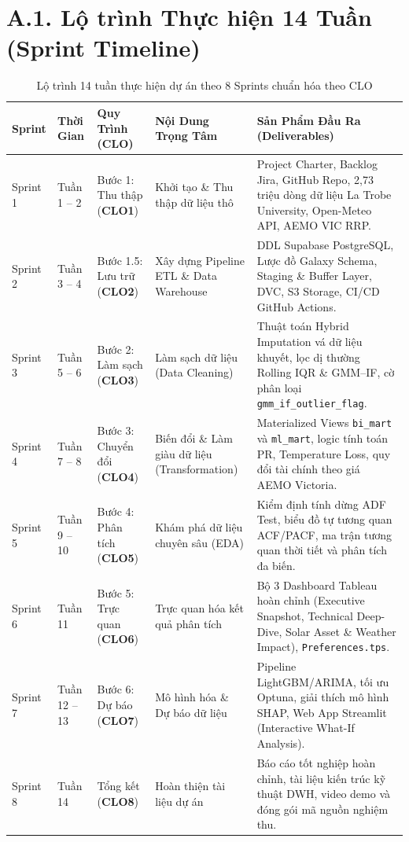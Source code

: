 \documentclass[12pt, a4paper]{report}
\begin{document}
\section*{A.1. Lộ trình Thực hiện 14 Tuần (Sprint Timeline)}
\begin{table}[H]
\centering
\caption{Lộ trình 14 tuần thực hiện dự án theo 8 Sprints chuẩn hóa theo CLO}
\label{tab:sprint_timeline}
\small
\renewcommand{\arraystretch}{1}
\begin{tabularx}{\textwidth}{@{} l l p{3.2cm} p{3.8cm} X @{}}
\toprule
\textbf{Sprint} & \textbf{Thời Gian} & \textbf{Quy Trình (CLO)} & \textbf{Nội Dung Trọng Tâm} & \textbf{Sản Phẩm Đầu Ra (Deliverables)} \\
\midrule
Sprint 1 & Tuần 1 -- 2 & Bước 1: Thu thập \newline (\textbf{CLO1}) & Khởi tạo \& Thu thập dữ liệu thô & Project Charter, Backlog Jira, GitHub Repo, 2,73 triệu dòng dữ liệu La Trobe University, Open-Meteo API, AEMO VIC RRP. \\
Sprint 2 & Tuần 3 -- 4 & Bước 1.5: Lưu trữ \newline (\textbf{CLO2}) & Xây dựng Pipeline ETL \& Data Warehouse & DDL Supabase PostgreSQL, Lược đồ Galaxy Schema, Staging \& Buffer Layer, DVC, S3 Storage, CI/CD GitHub Actions. \\
Sprint 3 & Tuần 5 -- 6 & Bước 2: Làm sạch \newline (\textbf{CLO3}) & Làm sạch dữ liệu (Data Cleaning) & Thuật toán Hybrid Imputation vá dữ liệu khuyết, lọc dị thường Rolling IQR \& GMM--IF, cờ phân loại \texttt{gmm\_if\_outlier\_flag}. \\
Sprint 4 & Tuần 7 -- 8 & Bước 3: Chuyển đổi \newline (\textbf{CLO4}) & Biến đổi \& Làm giàu dữ liệu (Transformation) & Materialized Views \texttt{bi\_mart} và \texttt{ml\_mart}, logic tính toán PR, Temperature Loss, quy đổi tài chính theo giá AEMO Victoria. \\
Sprint 5 & Tuần 9 -- 10 & Bước 4: Phân tích \newline (\textbf{CLO5}) & Khám phá dữ liệu chuyên sâu (EDA) & Kiểm định tính dừng ADF Test, biểu đồ tự tương quan ACF/PACF, ma trận tương quan thời tiết và phân tích đa biến. \\
Sprint 6 & Tuần 11 & Bước 5: Trực quan \newline (\textbf{CLO6}) & Trực quan hóa kết quả phân tích & Bộ 3 Dashboard Tableau hoàn chỉnh (Executive Snapshot, Technical Deep-Dive, Solar Asset \& Weather Impact), \texttt{Preferences.tps}. \\
Sprint 7 & Tuần 12 -- 13 & Bước 6: Dự báo \newline (\textbf{CLO7}) & Mô hình hóa \& Dự báo dữ liệu & Pipeline LightGBM/ARIMA, tối ưu Optuna, giải thích mô hình SHAP, Web App Streamlit (Interactive What-If Analysis). \\
Sprint 8 & Tuần 14 & Tổng kết \newline (\textbf{CLO8}) & Hoàn thiện tài liệu dự án & Báo cáo tốt nghiệp hoàn chỉnh, tài liệu kiến trúc kỹ thuật DWH, video demo và đóng gói mã nguồn nghiệm thu. \\
\bottomrule
\end{tabularx}



\end{table}
\end{document}
